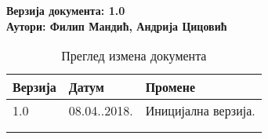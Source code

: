 \noindent
\textbf{Верзија документа: 1.0} \\
\textbf{Аутори: Филип Мандић, Андрија Цицовић}

\begin{table}[h!]
\centering
\small

    \begin{tabular}{ || m{} | m{} | m{} || }
    \hline
    \textbf{Верзија} & \textbf{Датум} & \textbf{Промене} \\
    \hline
    \hline
    1.0 & 08.04..2018. &
    Иницијална верзија. \\
    \hline
    & & \\
    \hline
    & & \\
    \hline
    \end{tabular}
    \caption{Преглед измена документа}
    \label{table:1}

\end{table}
\newpage
